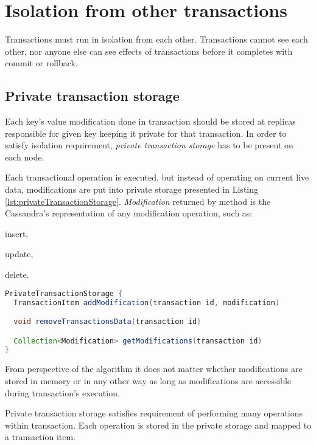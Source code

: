 
\section{Isolation from other transactions}
Transactions must run in isolation from each other. Transactions cannot see each other, nor anyone else can see effects of transactions before it completes with commit or rollback.

\subsection{Private transaction storage}
\label{sec:mpp:privateTxStorage}
Each key's value modification done in transaction should be stored at replicas responsible for given key keeping it private for that transaction. In order to satisfy isolation requirement, \emph{private transaction storage} has to be present on each node.

Each transactional operation is executed, but instead of operating on current live data, modifications are put into private storage presented in Listing \ref{lst:privateTransactionStorage}. \emph{Modification} returned by  method is the Cassandra's representation of any modification operation, such as: \begin{enumerate*} \item insert, \item update, \item delete. \end{enumerate*}

\begin{lstlisting}[language=Java,style=outcode,label={lst:privateTransactionStorage},caption={API of private transaction storage}]
PrivateTransactionStorage {
  TransactionItem addModification(transaction id, modification)

  void removeTransactionsData(transaction id)

  Collection<Modification> getModifications(transaction id)        
}

\end{lstlisting}


From perspective of the algorithm it does not matter whether modifications are stored in memory or in any other way as long as modifications are accessible during transaction's execution.

Private transaction storage satisfies requirement of performing many operations within transaction. Each operation is stored in the private storage and mapped to a transaction item.


